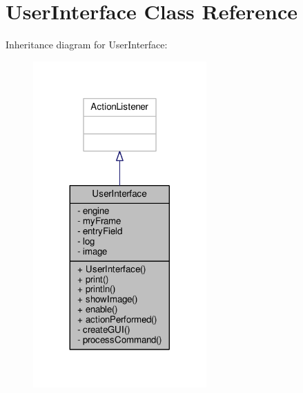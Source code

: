 \hypertarget{classUserInterface}{\section{User\-Interface Class Reference}
\label{classUserInterface}
}


Inheritance diagram for User\-Interface\-:
\nopagebreak
\begin{figure}[H]
\begin{center}
\leavevmode
\includegraphics[width=188pt]{classUserInterface__inherit__graph}
\end{center}
\end{figure}


